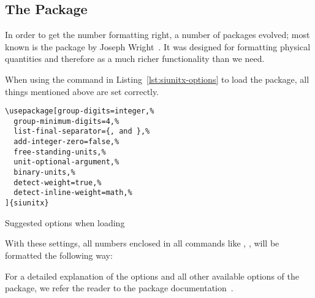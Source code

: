 \subsection{The Package }

In order to get the number formatting right, a number of packages evolved; most
known is the  package by Joseph Wright~\cite{Wright2016}.  It
was designed for formatting physical quantities and therefore as a much richer
functionality than we need.

When using the command in Listing~\ref{lst:siunitx-options} to load the package,
all things mentioned above are set correctly.

\begin{listing}[H]
\begin{verbatim}
\usepackage[group-digits=integer,%
  group-minimum-digits=4,%
  list-final-separator={, and },%
  add-integer-zero=false,%
  free-standing-units,%
  unit-optional-argument,%
  binary-units,%
  detect-weight=true,%
  detect-inline-weight=math,%
]{siunitx}
\end{verbatim}
\caption{Suggested options when loading }
\label{lst:siunitx-options}
\end{listing}

With these settings, all numbers enclosed in all  commands
like \texttt{\num{}}, \texttt{\numlist{}},
\texttt{\SI{}{}} will be formatted the
following way:

For a detailed explanation of the options and all other available options of the
 package, we refer the reader to the package
documentation~\cite{Wright2016}.
